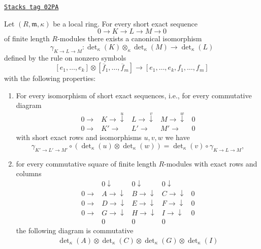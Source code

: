 \begin{lemma}
\label{chow-lemma-det-exact-sequences}
\href{https://stacks.math.columbia.edu/tag/02PA}{\texttt{Stacks tag 02PA}}

Let $(R, \mathfrak m, \kappa)$ be a local ring.
For every short exact sequence
$$
0 \to K \to L \to M \to 0
$$
of finite length $R$-modules there exists a canonical isomorphism
$$
\gamma_{K \to L \to M} :
\det\nolimits_\kappa(K) \otimes_\kappa \det\nolimits_\kappa(M)
\longrightarrow
\det\nolimits_\kappa(L)
$$
defined by the rule on nonzero symbols
$$
[e_1, \ldots, e_k]
\otimes
[\overline{f}_1, \ldots, \overline{f}_m]
\longrightarrow
[e_1, \ldots, e_k, f_1, \ldots, f_m]
$$
with the following properties:
\begin{enumerate}
\item For every isomorphism of short exact sequences, i.e., for
every commutative diagram
$$
\begin{array}{ccccc}0 \longrightarrow & K \longrightarrow\overset{u}{\downarrow} & L \longrightarrow\overset{v}{\downarrow} & M \longrightarrow\overset{w}{\downarrow} & 0 \\ 0 \longrightarrow & K' \longrightarrow & L' \longrightarrow & M' \longrightarrow & 0\end{array}
$$
with short exact rows and isomorphisms $u, v, w$ we have
$$
\gamma_{K' \to L' \to M'} \circ
(\det\nolimits_\kappa(u) \otimes \det\nolimits_\kappa(w))
=
\det\nolimits_\kappa(v) \circ
\gamma_{K \to L \to M},
$$
\item for every commutative square of finite length $R$-modules
with exact rows and columns
$$
\begin{array}{ccccc} & 0 \downarrow & 0 \downarrow & 0 \downarrow &  \\ 0 \longrightarrow & A \longrightarrow\downarrow & B \longrightarrow\downarrow & C \longrightarrow\downarrow & 0 \\ 0 \longrightarrow & D \longrightarrow\downarrow & E \longrightarrow\downarrow & F \longrightarrow\downarrow & 0 \\ 0 \longrightarrow & G \longrightarrow\downarrow & H \longrightarrow\downarrow & I \longrightarrow\downarrow & 0 \\  & 0 & 0 & 0 & \end{array}
$$
the following diagram is commutative
$$
\begin{array}{cccc}\det\nolimits_\kappa(A) \otimes
\det\nolimits_\kappa(C) \otimes
\det\nolimits_\kappa(G) \otimes
\det\nolimits_\kappa(I)

\end{array}$$
\end{enumerate}
\end{lemma}
